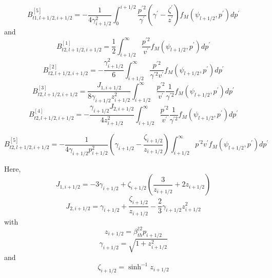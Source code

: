 \begin{equation}
B_{t1,l+1/2,i+1/2}^{\left[ 5\right] }=-\frac{1}{4\gamma _{i+1/2}^{2}}
\int_{0}^{i+1/2}\frac{p^{\prime 2}}{\gamma ^{\prime }}\left( \gamma ^{\prime
}-\frac{\zeta ^{\prime }}{z^{\prime }}\right) f_{M}\left( \psi
_{l+1/2},p^{\prime }\right) dp^{\prime }
\end{equation}
and
\begin{equation}
B_{t2,l+1/2,i+1/2}^{\left[ 1\right] }=\frac{1}{2}\int_{i+1/2}^{\infty }\frac{
p^{\prime 2}}{v^{\prime }}f_{M}\left( \psi _{l+1/2},p^{\prime }\right)
dp^{\prime }
\end{equation}
\begin{equation}
B_{t2,l+1/2,i+1/2}^{\left[ 2\right] }=-\frac{\gamma _{i+1/2}^{2}}{6}
\int_{i+1/2}^{\infty }\frac{p^{\prime 2}}{\gamma ^{\prime 2}v^{\prime }}%
f_{M}\left( \psi _{l+1/2},p^{\prime }\right) dp^{\prime }
\end{equation}
\begin{equation}
B_{t2,l+1/2,i+1/2}^{\left[ 3\right] }=\frac{J_{1,i+1/2}}{8\gamma
_{i+1/2}z_{i+1/2}^{2}}\int_{i+1/2}^{\infty }\frac{p^{\prime 2}}{v^{\prime }}%
\frac{1}{\gamma ^{\prime 2}}f_{M}\left( \psi _{l+1/2},p^{\prime }\right)
dp^{\prime }
\end{equation}
\begin{equation}
B_{t2,l+1/2,i+1/2}^{\left[ 4\right] }=-\frac{\gamma _{i+1/2}J_{2,i+1/2}}{
4z_{i+1/2}^{2}}\int_{i+1/2}^{\infty }\frac{p^{\prime 2}}{v^{\prime }}\frac{1%
}{\gamma ^{\prime 2}}f_{M}\left( \psi _{l+1/2},p^{\prime }\right) dp^{\prime
}
\end{equation}

\begin{equation}
B_{t2,l+1/2,i+1/2}^{\left[ 5\right] }=-\frac{1}{4\gamma _{i+1/2}p_{i+1/2}^{2}%
}\left( \gamma _{i+1/2}-\frac{\zeta _{i+1/2}}{z_{i+1/2}}\right)
\int_{i+1/2}^{\infty }p^{\prime 2}v^{\prime }f_{M}\left( \psi
_{l+1/2},p^{\prime }\right) dp^{\prime }
\end{equation}

Here,
\begin{equation}
J_{1,i+1/2}=-3\gamma _{i+1/2}+\zeta _{i+1/2}\left( \frac{3}{z_{i+1/2}}
+2z_{i+1/2}\right)
\end{equation}
\begin{equation}
J_{2,i+1/2}=\gamma _{i+1/2}+\frac{\zeta _{i+1/2}}{z_{i+1/2}}-\frac{2}{3}%
\gamma _{i+1/2}z_{i+1/2}^{2}
\end{equation}
with
\begin{equation}
z_{i+1/2}=\beta _{th}^{\dag 2}p_{i+1/2}
\end{equation}
\begin{equation}
\gamma _{i+1/2}=\sqrt{1+z_{i+1/2}^{2}}
\end{equation}
and
\begin{equation}
\zeta _{i+1/2}=\sinh ^{-1}z_{i+1/2}
\end{equation}

